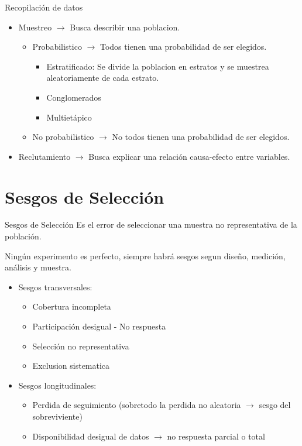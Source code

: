 \documentclass[a4paper,11pt]{article}
\begin{document}
\begin{definicion}{Recopilación de datos}{}
    \begin{itemize}
        \item Muestreo $\rightarrow$ Busca describir una poblacion.
        \begin{itemize}
            \item Probabilistico $\rightarrow$ Todos tienen una probabilidad de ser elegidos.
            \begin{itemize}
                \item Estratificado: Se divide la poblacion en estratos y se muestrea aleatoriamente de cada estrato.
                \item Conglomerados
                \item Multietápico
            \end{itemize}
            \item No probabilistico $\rightarrow$ No todos tienen una probabilidad de ser elegidos.
        \end{itemize}
        \item Reclutamiento $\rightarrow$ Busca explicar una relación causa-efecto entre variables.
    \end{itemize}
\end{definicion}

\newpage
\section{Sesgos de Selección}

\begin{definicion}{Sesgos de Selección}{}
    Es el error de seleccionar una muestra no representativa de la población.
    \begin{nota}
        Ningún experimento es perfecto, siempre habrá sesgos segun diseño, medición, análisis y muestra.
    \end{nota}
    \begin{itemize}
        \item Sesgos transversales: 
        \begin{itemize}
            \item Cobertura incompleta
            \item Participación desigual - No respuesta
            \item Selección no representativa
            \item Exclusion sistematica
        \end{itemize}
        \item Sesgos longitudinales:
        \begin{itemize}
            \item Perdida de seguimiento (sobretodo la perdida no aleatoria $\rightarrow$ sesgo del sobreviviente)
            \item Disponibilidad desigual de datos $\rightarrow$ no respuesta parcial o total
        \end{itemize}
    \end{itemize}
\end{definicion}
\end{document}
